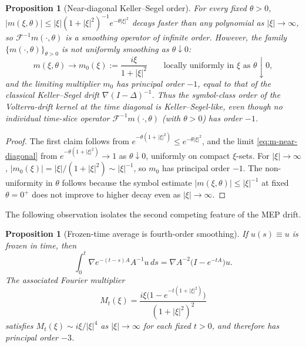 \documentclass[11pt,reqno]{amsart}
\newtheorem{proposition}[theorem]{Proposition}
\theoremstyle{definition}
\theoremstyle{remark}
\begin{document}
\begin{proposition}[Near-diagonal Keller--Segel order]\label{prop:MEP-near-diagonal}
For every fixed $\theta>0$, $|m(\xi,\theta)|\le |\xi|(1+|\xi|^{2})^{-1}e^{-\theta|\xi|^{2}}$ decays faster than any polynomial as $|\xi|\to\infty$, so $\mathcal{F}^{-1}m(\cdot,\theta)$ is a smoothing operator of infinite order. However, the family $\{m(\cdot,\theta)\}_{\theta>0}$ is \emph{not} uniformly smoothing as $\theta\downarrow 0$: 
\begin{equation}\label{eq:m-near-diagonal}
        m(\xi,\theta)\longrightarrow m_0(\xi):=\frac{i\xi}{1+|\xi|^{2}}
        \qquad\text{locally uniformly in }\xi\text{ as }\theta\downarrow 0,
\end{equation}
and the limiting multiplier $m_0$ has principal order $-1$, equal to that of the classical Keller--Segel drift $\nabla(I-\Delta)^{-1}$. Thus the symbol-class order of the Volterra-drift kernel at the time diagonal is Keller--Segel-like, even though no individual time-slice operator $\mathcal{F}^{-1}m(\cdot,\theta)$ (with $\theta>0$) has order $-1$.
\end{proposition}

\begin{proof}
The first claim follows from $e^{-\theta(1+|\xi|^{2})}\le e^{-\theta|\xi|^{2}}$, and the limit \eqref{eq:m-near-diagonal} from $e^{-\theta(1+|\xi|^{2})}\to 1$ as $\theta\downarrow 0$, uniformly on compact $\xi$-sets. For $|\xi|\to\infty$, $|m_0(\xi)|=|\xi|/(1+|\xi|^{2})\sim|\xi|^{-1}$, so $m_0$ has principal order $-1$. The non-uniformity in $\theta$ follows because the symbol estimate $|m(\xi,\theta)|\le|\xi|^{-1}$ at fixed $\theta=0^+$ does not improve to higher decay even as $|\xi|\to\infty$.
\end{proof}

The following observation isolates the second competing feature of the MEP drift.

\begin{proposition}[Frozen-time average is fourth-order smoothing]\label{prop:frozen-average}
If $u(s)\equiv u$ is frozen in time, then
\begin{equation}\label{eq:frozen-average}
        \int_0^t \nabla e^{-(t-s)A}A^{-1}u\,ds
        =\nabla A^{-2}\bigl(I-e^{-tA}\bigr)u.
\end{equation}
The associated Fourier multiplier
\[
        M_t(\xi)=\frac{i\xi\bigl(1-e^{-t(1+|\xi|^{2})}\bigr)}{(1+|\xi|^{2})^{2}}
\]
satisfies $M_t(\xi)\sim i\xi/|\xi|^{4}$ as $|\xi|\to\infty$ for each fixed $t>0$, and therefore has principal order $-3$.
\end{proposition}
\end{document}
